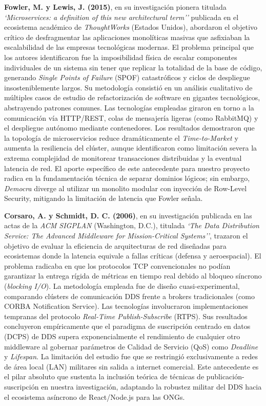 \documentclass[11pt,a4paper,oneside]{report}
\begin{document}
\textbf{Fowler, M. y Lewis, J. (2015)}, en su investigaci\'on pionera titulada \textit{`Microservices: a definition of this new architectural term''} publicada en el ecosistema acad\'emico de \textit{ThoughtWorks} (Estados Unidos), abordaron el objetivo cr\'itico de desfragmentar las aplicaciones monol\'iticas masivas que asfixiaban la escalabilidad de las empresas tecnol\'ogicas modernas. El problema principal que los autores identificaron fue la imposibilidad f\'isica de escalar componentes individuales de un sistema sin tener que replicar la totalidad de la base de c\'odigo, generando \textit{Single Points of Failure} (SPOF) catastr\'oficos y ciclos de despliegue insosteniblemente largos. Su metodolog\'ia consisti\'o en un an\'alisis cualitativo de m\'ultiples casos de estudio de refactorizaci\'on de software en gigantes tecnol\'ogicos, abstrayendo patrones comunes. Las tecnolog\'ias empleadas giraron en torno a la comunicaci\'on v\'ia HTTP/REST, colas de mensajer\'ia ligeras (como RabbitMQ) y el despliegue aut\'onomo mediante contenedores. Los resultados demostraron que la topolog\'ia de microservicios reduce dram\'aticamente el \textit{Time-to-Market} y aumenta la resiliencia del cl\'uster, aunque identificaron como limitaci\'on severa la extrema complejidad de monitorear transacciones distribuidas y la eventual latencia de red. El aporte espec\'ifico de este antecedente para nuestro proyecto radica en la fundamentaci\'on t\'ecnica de separar dominios l\'ogicos; sin embargo, \textit{Democra} diverge al utilizar un monolito modular con inyecci\'on de Row-Level Security, mitigando la limitaci\'on de latencia que Fowler se\~nala.

\textbf{Corsaro, A. y Schmidt, D. C. (2006)}, en su investigaci\'on publicada en las actas de la \textit{ACM SIGPLAN} (Washington, D.C.), titulada \textit{`The Data Distribution Service: The Advanced Middleware for Mission-Critical Systems''}, trazaron el objetivo de evaluar la eficiencia de arquitecturas de red dise\~nadas para ecosistemas donde la latencia equivale a fallas cr\'iticas (defensa y aeroespacial). El problema radicaba en que los protocolos TCP convencionales no pod\'ian garantizar la entrega r\'igida de m\'etricas en tiempo real debido al bloqueo s\'incrono (\textit{blocking I/O}). La metodolog\'ia empleada fue de dise\~no cuasi-experimental, comparando cl\'usters de comunicaci\'on DDS frente a brokers tradicionales (como CORBA Notification Service). Las tecnolog\'ias involucraron implementaciones tempranas del protocolo \textit{Real-Time Publish-Subscribe} (RTPS). Sus resultados concluyeron emp\'iricamente que el paradigma de suscripci\'on centrado en datos (DCPS) de DDS supera exponencialmente el rendimiento de cualquier otro middleware al gobernar par\'ametros de Calidad de Servicio (QoS) como \textit{Deadline} y \textit{Lifespan}. La limitaci\'on del estudio fue que se restringi\'o exclusivamente a redes de \'area local (LAN) militares sin salida a internet comercial. Este antecedente es el pilar absoluto que sustenta la inclusi\'on te\'orica de t\'ecnicas de publicaci\'on-suscripci\'on en nuestra investigaci\'on, adaptando la robustez militar del DDS hacia el ecosistema as\'incrono de React/Node.js para las ONGs.
\end{document}
